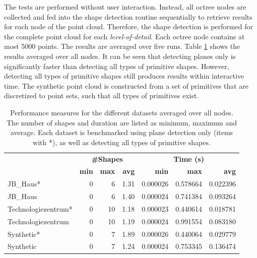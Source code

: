 The tests are performed without user interaction. Instead, all octree nodes are collected and fed into the shape detection routine sequentially to retrieve results for each node of the point cloud. Therefore, the shape detection is performed for the complete point cloud for each \textit{level-of-detail}. Each octree node contains at most 5000 points. The results are averaged over five runs. Table \ref{table:schnabel_benchmarks} shows the results averaged over all nodes. It can be seen that detecting planes only is significantly faster than detecting all types of primitive shapes. However, detecting all types of primitive shapes still produces results within interactive time. The synthetic point cloud is constructed from a set of primitives that are discretized to point sets, such that all types of primitives exist. 

\begin{table}
    \centering
    \begin{tabular}{ l || r | r | r || r | r | r}
            &\multicolumn{3}{c||}{\textbf{\#Shapes}} & \multicolumn{3}{c}{\textbf{Time (s)}}\\
            &\textbf{min} & \textbf{max} & \textbf{avg}  & \textbf{min} & \textbf{max} & \textbf{avg}  \\
            \hline
            JB\_Haus*                            & 0 & 6  & 1.31 & 0.000026 & 0.578664 & 0.022396 \\
            JB\_Haus                             & 0 & 6  & 1.40 & 0.000024 & 0.741384 & 0.093264 \\
            Technologiezentrum*        & 0 & 10 & 1.18 & 0.000023 & 0.440614 & 0.018781 \\
            Technologiezentrum         & 0 & 10 & 1.19 & 0.000024 & 0.991554 & 0.083180 \\
            Synthetic*                        & 0 & 7  & 1.89 & 0.000026 & 0.440064 & 0.029779 \\
            Synthetic                         & 0 & 7  & 1.24 & 0.000024 & 0.753345 & 0.136474 \\
        \end{tabular}
    \caption{Performance measures for the different datasets averaged over all nodes. The number of shapes and duration are listed as minimum, maximum and average. Each dataset is benchmarked using plane detection only (items with *), as well as detecting all types of primitive shapes. }
    \label{table:schnabel_benchmarks}
\end{table}


